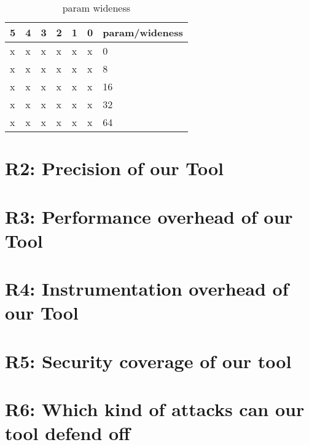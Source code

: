 \begin{table}[H]
\centering
\caption{param wideness}
\label{Integer overflow bug detection in CWE-190}
\begin{tabular}{|l|l|l|l|l|l|l|} \hline
\textbf{5}  & \textbf{4}     & \textbf{3}    &\textbf{2} & \textbf{1}  & \textbf{0} &\textbf{param/wideness}  \\ \hline 
x           &x               &x              &x          &x            &x           &0                         \\ \hline
x           &x               &x              &x          &x            &x           &8                         \\ \hline
x           &x               &x              &x          &x            &x           &16                         \\ \hline
x           &x               &x              &x          &x            &x           &32                         \\ \hline
x           &x               &x              &x          &x            &x           &64                         \\ \hline

\end{tabular}
\end{table}


\section{R2: Precision of our Tool}

\section{R3: Performance overhead of our Tool}

\section{R4: Instrumentation overhead of our Tool}

\section{R5: Security coverage of our tool}

\section{R6: Which kind of attacks can our tool defend off}

